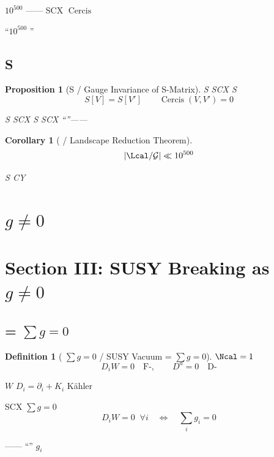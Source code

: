 \documentclass[12pt,a4paper]{article}
\theoremstyle{plain}
\newtheorem{proposition}[theorem]{ Proposition}
\newtheorem{corollary}[theorem]{ Corollary}
\theoremstyle{definition}
\newtheorem{definition}[theorem]{ Definition}
\newcommand{\Gauge}{\mathcal{G}}
\DeclareMathOperator{\Cercis}{Cercis}
\begin{document}
\begin{honestcrit}
 $10^{500}$ ——
SCX  $\Cercis$ 

``$10^{500}$ ''
\end{honestcrit}


\subsection{S }

\begin{proposition}[S  / Gauge Invariance of S-Matrix]
S  SCX S \textbf{}
\begin{equation}
    S[V] = S[V'] \quad \text{} \quad \Cercis(V, V') = 0
\end{equation}

 S  SCX 
S  SCX ``''——
\end{proposition}

\begin{corollary}[ / Landscape Reduction Theorem]

\begin{equation}
    \left| \Lcal / \Gauge \right| \ll 10^{500}
\end{equation}

 S 
 CY 
\end{corollary}

\newpage


\section{ $g \neq 0$}
\section*{Section III: SUSY Breaking as $g \neq 0$}

\subsection{ = $\sum g = 0$}

\begin{definition}[ $\sum g = 0$ / SUSY Vacuum = $\sum g = 0$]
 $\Ncal = 1$ 
\begin{equation}
    D_i W = 0 \quad \text{F-}, \qquad
    D^a = 0 \quad \text{D-}
\end{equation}

 $W$ $D_i = \partial_i + K_i$  Kähler 

 SCX  $\sum g = 0$
\begin{equation}
    D_i W = 0 \;\; \forall i \quad \Longleftrightarrow \quad
    \sum_{i} g_i = 0
\end{equation}

\textbf{}——
``'' $g_i$ 
\end{definition}
\end{document}
